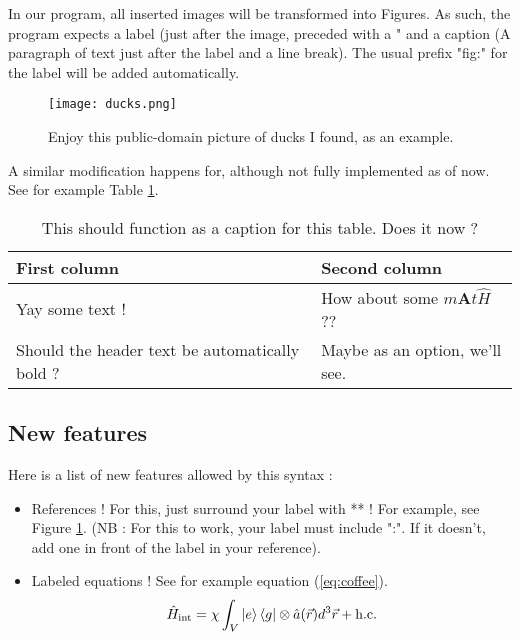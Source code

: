 \documentclass{article}
\begin{document}
\begin{maincontent}
In our program, all inserted images will be transformed into Figures. As such, the program expects a label (just after the image, preceded with a "\label{"),} and a caption (A paragraph of text just after the label and a line break). The usual prefix "fig:" for the label will be added automatically.


\begin{figure}
    \centering
    \texttt{[image: ducks.png]}
    \caption{Enjoy this public-domain picture of ducks I found, as an example.}
    \label{fig:ducks}
\end{figure}
        

A similar modification happens for, although not fully implemented as of now. See for example Table \ref{tab:cool-table}.

\begin{table}
    \centering
    \begin{tabular}{l|l}
First column & Second column \\
\hline
Yay some text ! & How about some $m\mathbf{A}t\hat{H}$ ?? \\
Should the header text be automatically bold ? & Maybe as an option, we'll see. \\

\end{tabular}

    \caption{This should function as a caption for this table. Does it now ?}
    \label{tab:cool-table}
\end{table}
        
\subsection{New features}

Here is a list of new features allowed by this syntax :
\begin{itemize}
\item 
References ! For this, just surround your label with ** ! For example, see Figure \ref{fig:ducks}. (NB : For this to work, your label must include ":". If it doesn't, add one in front of the label in your reference).

\item 
Labeled equations ! See for example equation (\ref{eq:coffee}).\begin{equation}
	\hat{H}_{\text{int}}=\chi\int _{V}\ket{e} \bra{g} \otimes \hat{a}(\vec{r})d^{3}\vec{r}+\text{h.c.}
\label{eq:coffee}\end{equation}



\end{itemize}
\end{maincontent}
\end{document}
